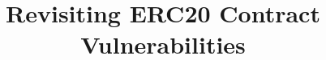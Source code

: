\documentclass[envcountsect]{llncs}
\begin{document}
\frontmatter
\mainmatter

\title{\Large \bf Revisiting ERC20 Contract Vulnerabilities}

\maketitle


















\clearpage
\appendix
\end{document}
